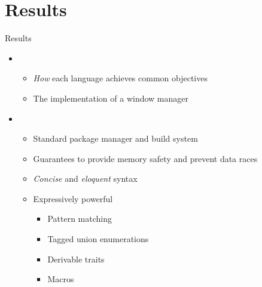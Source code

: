 
\section{Results}

\begin{frame}[t]{Results}

    \begin{itemize}
        \itemsep.3em

        \item {}
            \begin{itemize}
                \item \textit{How} each language achieves common objectives
                \item The implementation of a window manager
            \end{itemize}

        \item {}
            \begin{itemize}
                \item Standard package manager and build system
                \item Guarantees to provide memory safety and prevent data races
                \item \textit{Concise} and \textit{eloquent} syntax
                \item Expressively powerful
                    \begin{itemize}
                        \item Pattern matching
                        \item Tagged union enumerations
                        \item Derivable traits
                        \item Macros
                    \end{itemize}
            \end{itemize}

    \end{itemize}

    \vfill

\end{frame}

